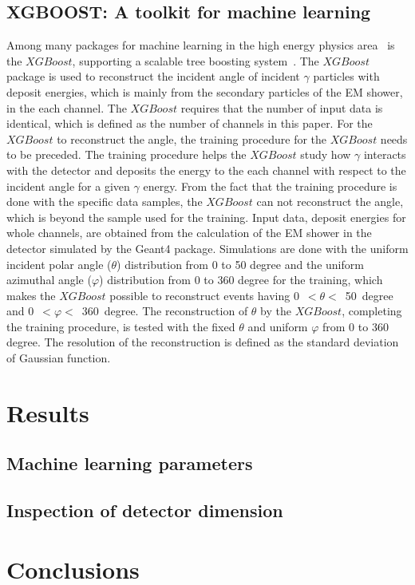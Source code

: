 \documentclass[jkps,preprint,fleqn,showpacs,showkeys]{revtex4}
\newcommand{\XGB}{XGBoost}
\begin{document}
\subsection{XGBOOST: A toolkit for machine learning}
\label{sec:anaML}
Among many packages for machine learning in the high energy physics area~\cite{ATLAS:2020iwa} is the $\XGB$, supporting a scalable tree boosting system~\cite{xgboost:2016}. The $\XGB$ package is used to reconstruct the incident angle of incident $\gamma$ particles with deposit energies, which is mainly from the secondary particles of the EM shower, in the each channel. The $\XGB$ requires that the number of input data is identical, which is defined as the number of channels in this paper. For the $\XGB$ to reconstruct the angle, the training procedure for the $\XGB$ needs to be preceded. The training procedure helps the $\XGB$ study how $\gamma$ interacts with the detector and deposits the energy to the each channel with respect to the incident angle for a given $\gamma$ energy. From the fact that the training procedure is done with the specific data samples, the $\XGB$ can not reconstruct the angle, which is beyond the sample used for the training. Input data, deposit energies for whole channels, are obtained from the calculation of the EM shower in the detector simulated by the Geant4 package. Simulations are done with the uniform incident polar angle ($\theta$) distribution from 0 to 50 degree and the uniform azimuthal angle ($\varphi$) distribution from 0 to 360 degree for the training, which makes the $\XGB$ possible to reconstruct events having 0~$<\theta<$~50~degree and 0~$<\varphi<$~360~degree. The reconstruction of $\theta$ by the $\XGB$, completing the training procedure, is tested with the fixed $\theta$ and uniform $\varphi$ from 0 to 360 degree. The resolution of the reconstruction is defined as the standard deviation of Gaussian function. 

\section{Results}
\label{sec:res}
\subsection{Machine learning parameters}


\subsection{Inspection of detector dimension}


\section{Conclusions}

\label{sec:con}



\begin{acknowledgments}
\end{acknowledgments}


\end{document}
